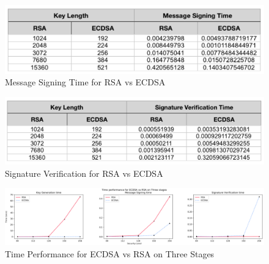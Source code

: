 \documentclass[10pt,sigconf]{acmart}
\begin{document}
\begin{figure}[H]
\centering
\includegraphics[scale=0.62]{new_evr_sign}
\caption{\small{Message Signing Time for RSA vs ECDSA}}
\label{fig:new_evr_sign}
\end{figure}

\begin{figure}[H]
\centering
\includegraphics[scale=0.62]{new_evr_veri}
\caption{\small{Signature Verification for RSA vs ECDSA}}
\label{fig:new_evr_veri}
\end{figure}





\begin{figure}
\centering
\includegraphics[scale=0.5]{EVR_overall}
\caption{\small{Time Performance for ECDSA vs RSA on Three Stages }}
\label{fig:EVR_overall}
\end{figure}
\end{document}
